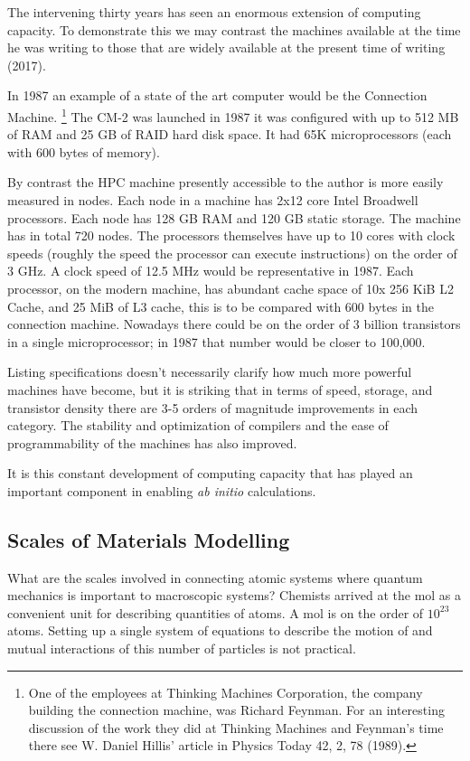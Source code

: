The intervening thirty years has seen an enormous extension of computing capacity. 
To demonstrate this we may contrast the machines available at the time
he was writing to those that are widely available at the present time of writing (2017). 

In 1987 an example of a state of the art computer would be the Connection Machine.
\footnote{One of the employees at Thinking Machines Corporation,
the company building the connection machine, was Richard Feynman.
For an interesting discussion of the work they
did at Thinking Machines and Feynman's time there see W. Daniel
Hillis' article in Physics Today 42, 2, 78 (1989).}
The CM-2 was launched in 1987 it was configured with up to 512 MB of RAM and 25 GB of RAID
hard disk space. It had 65K microprocessors (each with 600 bytes of memory). 

By contrast the HPC machine presently accessible to the author 
is more easily measured in nodes. Each node in a machine has 2x12 core Intel Broadwell processors.
Each node has 128 GB RAM and 120 GB static storage. The machine has in total 720 nodes. 
The processors themselves have up to 10 cores with clock speeds (roughly the speed the
processor can execute instructions) on the order of 3 GHz. A clock speed of 12.5 MHz 
would be representative in 1987. 
Each processor, on the modern machine, has abundant cache space of 10x 256 KiB L2 Cache, and 25 MiB of L3 cache,
this is to be compared with 600 bytes in the connection machine. 
Nowadays there could be on the order of 3 billion transistors in a single microprocessor;
in 1987 that number would be closer to 100,000. 

Listing specifications doesn't necessarily clarify how much more powerful machines have become, 
but it is striking that in terms of speed, storage, and transistor density 
there are 3-5 orders of magnitude improvements in each category. 
The stability and optimization of compilers and the ease of programmability
of the machines has also improved.

It is this constant development of computing capacity that 
has played an important component in enabling {\it ab initio} calculations. 

\subsection{Scales of Materials Modelling}
What are the scales involved in connecting atomic systems where quantum mechanics is important
to macroscopic systems? Chemists arrived at the mol as a convenient unit for describing
quantities of atoms. A mol is on the order of $10^{23}$ atoms. Setting up a single 
system of equations to describe the motion of and mutual interactions of 
this number of particles is not practical.

